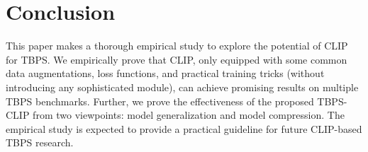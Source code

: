 \documentclass[letterpaper]{article} %
\begin{document}



\section{Conclusion}

This paper makes a thorough empirical study to explore the potential of CLIP for TBPS.
We empirically prove that CLIP, only equipped with some common data augmentations, loss functions, and practical training tricks (without introducing any sophisticated module), can achieve promising results on multiple TBPS benchmarks.
Further, we prove the effectiveness of the proposed TBPS-CLIP from two viewpoints: model generalization and model compression. 
The empirical study is expected to provide a practical guideline for future CLIP-based TBPS research.
\end{document}
